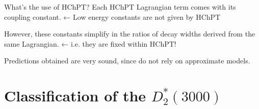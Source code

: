 \documentclass[professionalfonts,aspectratio=169]{beamer}
\begin{document}

\begin{frame}{What's the use of HChPT?}
  Each HChPT Lagrangian term comes with its coupling constant. ← \alert{Low energy constants are not given by HChPT} 
  
  \pause
  However, these constants simplify in the ratios of decay widths derived from the same Lagrangian. ← \alert{i.e. they are fixed within HChPT!}

  \pause
  Predictions obtained are very sound, since do not rely on approximate models.
  
\end{frame}


\section{Classification of the \(\left. D \right.^*_2(3000)\)}
\end{document}
